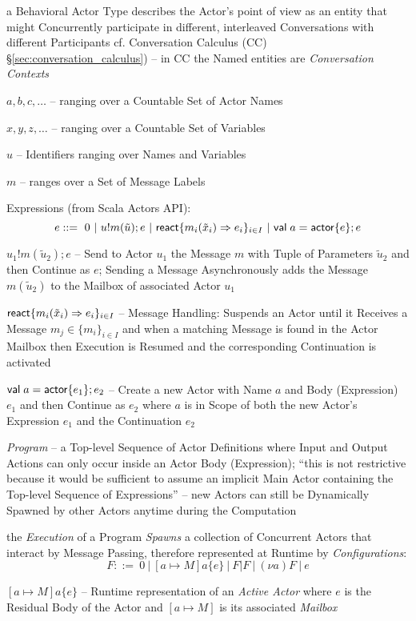 a Behavioral Actor Type describes the Actor's point of view as an
entity that might Concurrently participate in different, interleaved
Conversations with different Participants \fist cf. Conversation
Calculus (CC) \S\ref{sec:conversation_calculus}) -- in CC the Named
entities are \emph{Conversation Contexts}

$a,b,c,\ldots$ -- ranging over a Countable Set of Actor Names

$x,y,z,\ldots$ -- ranging over a Countable Set of Variables

$u$ -- Identifiers ranging over Names and Variables

$m$ -- ranges over a Set of Message Labels

Expressions (from Scala Actors API):
\[
  e ::=\ 0 \ |\ u!m(\tilde{u});e
    \ |\ \mathsf{react} \{ m_i(\tilde{x}_i) \Rightarrow e_i \}_{i \in I}
    \ |\ \mathsf{val\;} a = \mathsf{actor} \{ e \};e
\]

$u_1 ! m(\tilde{u}_2) ; e$ -- Send to Actor $u_1$ the Message $m$ with
Tuple of Parameters $\tilde{u}_2$ and then Continue as $e$;
Sending a Message Asynchronously adds the Message $m(\tilde{u}_2)$ to
the Mailbox of associated Actor $u_1$

$\mathsf{react}\{ m_i(\tilde{x}_i) \Rightarrow e_i \}_{i \in I}$ -- Message
Handling: Suspends an Actor until it Receives a Message $m_j \in \{
m_i \}_{i \in I}$ and when a matching Message is found in the Actor
Mailbox then Execution is Resumed and the corresponding Continuation
is activated

$\mathsf{val\;} a = \mathsf{actor}\{e_1\};e_2$ -- Create a new Actor with Name $a$ and
Body (Expression) $e_1$ and then Continue as $e_2$ where $a$ is in
Scope of both the new Actor's Expression $e_1$ and the Continuation
$e_2$

\emph{Program} -- a Top-level Sequence of Actor Definitions where
Input and Output Actions can only occur inside an Actor Body
(Expression); ``this is not restrictive because it would be sufficient
to assume an implicit Main Actor containing the Top-level Sequence of
Expressions'' %
-- new Actors can still be Dynamically Spawned by other Actors anytime
during the Computation

the \emph{Execution} of a Program \emph{Spawns} a collection of
Concurrent Actors that interact by Message Passing, therefore
represented at Runtime by \emph{Configurations}:
\[
  F ::=\ 0 \ |\ [a \mapsto M] a \{e\} \ |\ F|F \ |\ (\nu a)F \ |\ e
\]

$[a \mapsto M]a\{e\}$ -- Runtime representation of an \emph{Active
  Actor} where $e$ is the Residual Body of the Actor and $[a \mapsto
  M]$ is its associated \emph{Mailbox}

